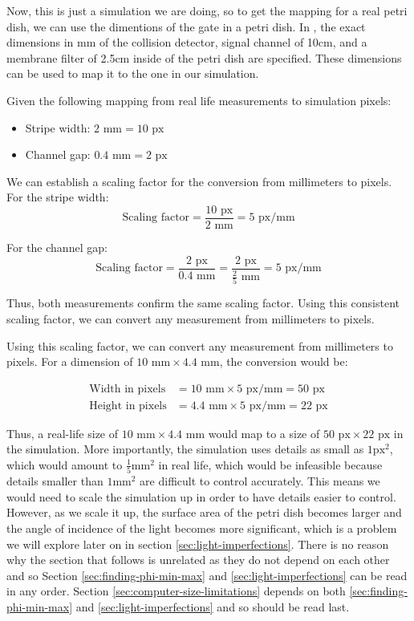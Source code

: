 Now, this is just a simulation we are doing, so to get the mapping for a real petri dish, we can use the dimentions of the gate in a petri dish. 
In \cite{gorecki2003chemical}, the exact dimensions in mm of the collision detector, signal channel of 10cm, and a membrane filter of 2.5cm inside of the petri dish are specified. These dimensions can be used to map it to the one in our simulation.


Given the following mapping from real life measurements to simulation pixels:
\begin{itemize}
    \item Stripe width: \(2 \text{ mm} = 10 \text{ px}\)
    \item Channel gap: \(0.4 \text{ mm} = 2 \text{ px}\)
\end{itemize}

We can establish a scaling factor for the conversion from millimeters to pixels.
For the stripe width:
\[ \text{Scaling factor} = \frac{10 \text{ px}}{2 \text{ mm}} = 5 \text{ px/mm} \]

For the channel gap:
\[ \text{Scaling factor} = \frac{2 \text{ px}}{0.4 \text{ mm}} = \frac{2 \text{ px}}{\frac{2}{5} \text{ mm}} = 5 \text{ px/mm} \]

Thus, both measurements confirm the same scaling factor. Using this consistent scaling factor, we can convert any measurement from millimeters to pixels.

Using this scaling factor, we can convert any measurement from millimeters to pixels.
For a dimension of \(10 \text{ mm} \times 4.4 \text{ mm}\), the conversion would be:

\begin{align*}
\text{Width in pixels} &= 10 \text{ mm} \times 5 \text{ px/mm} = 50 \text{ px} \\
\text{Height in pixels} &= 4.4 \text{ mm} \times 5 \text{ px/mm} = 22 \text{ px}
\end{align*}

Thus, a real-life size of \(10 \text{ mm} \times 4.4 \text{ mm}\) would map to a size of \(50 \text{ px} \times 22 \text{ px}\) in the simulation.
More importantly, the simulation uses details as small as $1\text{px}^2$, which would amount to $\frac{1}{5}\text{mm}^2$ in real life, which would be infeasible because details smaller than $1\text{mm}^2$ are difficult to control accurately.
This means we would need to scale the simulation up in order to have details easier to control. 
However, as we scale it up, the surface area of the petri dish becomes larger and the angle of incidence of the light becomes more significant, which is a problem we will explore later on in section \ref{sec:light-imperfections}.
There is no reason why the section that follows is unrelated as they do not depend on each other and 
so Section \ref{sec:finding-phi-min-max} and \ref{sec:light-imperfections} can be read in any order.
Section \ref{sec:computer-size-limitations} depends on both \ref{sec:finding-phi-min-max} and \ref{sec:light-imperfections} and so should be read last.


